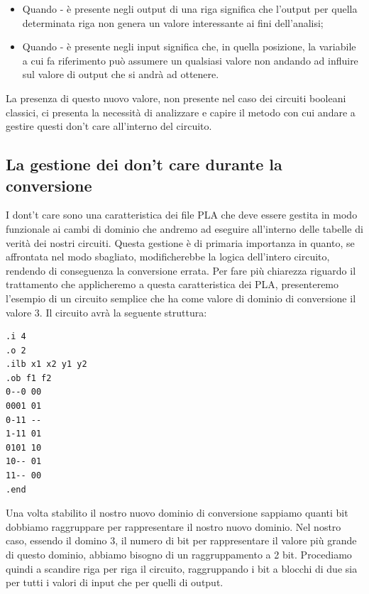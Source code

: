 \documentclass[
]{book}
\providecommand{\tightlist}{%
  \setlength{\itemsep}{0pt}\setlength{\parskip}{0pt}}
\begin{document}
\begin{itemize}
\tightlist
\item
  Quando - è presente negli output di una riga significa che l'output per quella determinata riga non genera un valore interessante ai fini dell'analisi;
\item
  Quando - è presente negli input significa che, in quella posizione, la variabile a cui fa riferimento può assumere un qualsiasi valore non andando ad influire sul valore di output che si andrà ad ottenere.
\end{itemize}

La presenza di questo nuovo valore, non presente nel caso dei circuiti booleani classici, ci presenta la necessità di analizzare e capire il metodo con cui andare a gestire questi don't care all'interno del circuito.

\hypertarget{la-gestione-dei-dont-care-durante-la-conversione}{%
\subsection{La gestione dei don't care durante la conversione}\label{la-gestione-dei-dont-care-durante-la-conversione}}

I dont't care sono una caratteristica dei file PLA che deve essere gestita in modo funzionale ai cambi di dominio che andremo ad eseguire all'interno delle tabelle di verità dei nostri circuiti. Questa gestione è di primaria importanza in quanto, se affrontata nel modo sbagliato, modificherebbe la logica dell'intero circuito, rendendo di conseguenza la conversione errata. Per fare più chiarezza riguardo il trattamento che applicheremo a questa caratteristica dei PLA, presenteremo l'esempio di un circuito semplice che ha come valore di dominio di conversione il valore 3. Il circuito avrà la seguente struttura:

\begin{verbatim}
.i 4
.o 2
.ilb x1 x2 y1 y2
.ob f1 f2
0--0 00    
0001 01
0-11 --
1-11 01
0101 10
10-- 01
11-- 00
.end
\end{verbatim}

\newpage

Una volta stabilito il nostro nuovo dominio di conversione sappiamo quanti bit dobbiamo raggruppare per rappresentare il nostro nuovo dominio. Nel nostro caso, essendo il domino 3, il numero di bit per rappresentare il valore più grande di questo dominio, abbiamo bisogno di un raggruppamento a 2 bit. Procediamo quindi a scandire riga per riga il circuito, raggruppando i bit a blocchi di due sia per tutti i valori di input che per quelli di output.
\end{document}
